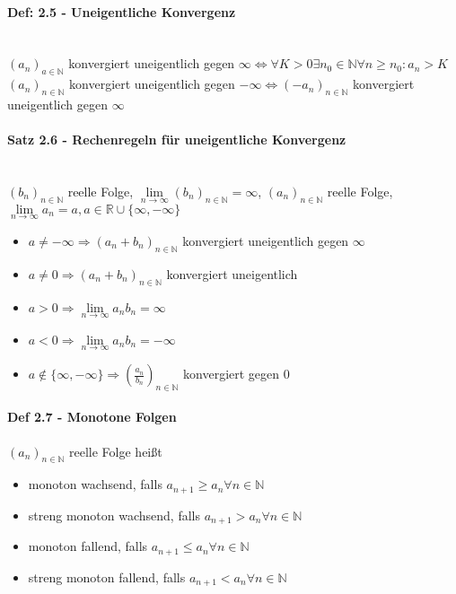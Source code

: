 \documentclass[paper=a3,paper=landscape, fontsize=9pt,DIV=25]{scrartcl}
\newcommand{\real}{{\mathbb{R}}}
\newcommand{\nat}{\mathbb{N}}
\newcommand{\aseq}{(a_n)_{n \in \nat}}
\begin{document}
\begin{multicols*}{4}
  \paragraph{Def: 2.5 - Uneigentliche Konvergenz}\hspace{0pt} \\
  $(a_n)_{a \in \nat}$ konvergiert uneigentlich gegen $\infty \Leftrightarrow \forall K > 0 \exists n_0 \in \nat \forall n \geq n_0: a_n > K$\\
  $\aseq$ konvergiert uneigentlich gegen $-\infty \Leftrightarrow (-a_n)_{n \in \nat}$ konvergiert uneigentlich gegen $\infty$


  \paragraph{Satz 2.6 - Rechenregeln für uneigentliche Konvergenz}\hspace{0pt} \\
  $(b_n)_{n \in \nat}$ reelle Folge, $\lim\limits_{n \rightarrow \infty} (b_n)_{n \in \nat} = \infty$, $\aseq$ reelle Folge, $\lim\limits_{n \rightarrow \infty} a_n = a, a \in \real \cup \{\infty, -\infty\}$

  \begin{itemize}
  \item $a \neq - \infty \Rightarrow (a_n + b_n)_{n \in \nat}$ konvergiert uneigentlich gegen $\infty$
  \item $a \neq 0 \Rightarrow (a_n + b_n)_{n \in \nat}$ konvergiert uneigentlich
  \item $a > 0 \Rightarrow \lim\limits_{n \rightarrow \infty} a_nb_n = \infty$
  \item $a < 0 \Rightarrow \lim\limits_{n \rightarrow \infty} a_nb_n = -\infty$
  \item $a \notin \{\infty, -\infty\} \Rightarrow (\frac{a_n}{b_n})_{n \in \nat}$ konvergiert gegen 0
  \end{itemize}


  \paragraph{Def 2.7 - Monotone Folgen}
  $\aseq$ reelle Folge heißt
  \begin{itemize}
  \item monoton wachsend, falls $a_{n+1} \geq a_n \forall n \in \nat$
  \item streng monoton wachsend, falls  $a_{n+1} > a_n \forall n \in \nat$
  \item monoton fallend, falls  $a_{n+1} \leq a_n \forall n \in \nat$
  \item streng monoton fallend, falls  $a_{n+1} < a_n \forall n \in \nat$
  \end{itemize}



\end{multicols*}
\end{document}
